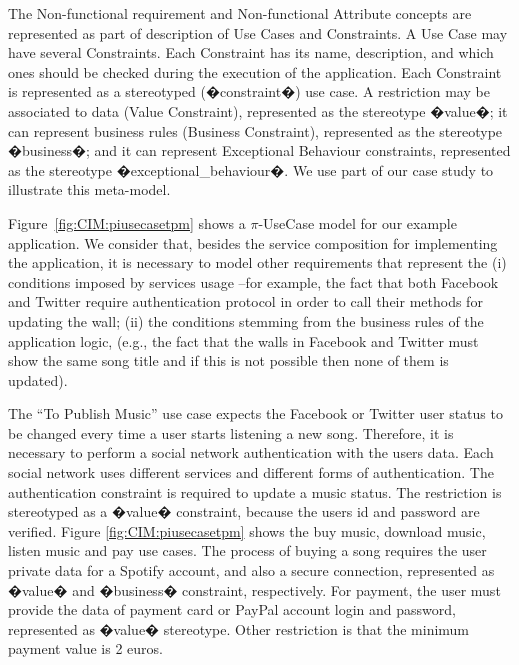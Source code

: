  The {\sc Non-functional requirement} and {\sc Non-functional Attribute} concepts are represented as part of description of {\sc Use Cases} and {\sc Constraints}. 
A {\sc Use Case} may have several {\sc Constraints}. Each {\sc Constraint} has its name, description, and which ones should be checked during the execution of the application. Each {\sc Constraint} is represented as a stereotyped ({\sf �constraint�}) use case. A restriction may be associated to data ({\sc Value Constraint}), represented as the stereotype �value�; it can represent business rules (Business Constraint), represented as the stereotype {\sf �business�}; and it can represent {\sc Exceptional Behaviour} constraints, represented as the stereotype {\sf �exceptional\_behaviour�}.
 We use part of our case study to illustrate this meta-model. 
 \begin{example}\label{ex:toPublicMusic2}
Figure~\ref{fig:CIM:piusecasetpm} shows a $\pi$-UseCase model for our example application.
We consider that, besides the service composition for implementing the application, it is necessary to model  other requirements that represent the (i) conditions imposed by services usage --for example, the fact that both Facebook and Twitter require authentication protocol in order to call their methods for updating the wall; (ii) the conditions stemming from the business rules of the application logic, (e.g., the fact that the walls in Facebook and Twitter must show the same song title and if this is not possible then none of them is updated). 
 
The ``To Publish Music'' use case expects  the Facebook or Twitter user status to be changed every time a user starts listening a new song.
  Therefore, it is necessary to perform a social network authentication with the users data. Each social network uses different services and different forms of authentication. The authentication constraint is required to update a music status. The restriction is stereotyped as a �value� constraint, because the users id and password are verified.  Figure \ref{fig:CIM:piusecasetpm} shows the buy music, download music, listen music and pay use cases. The process of buying a song requires the user private data for a Spotify account, and also a secure connection, represented as �value� and �business� constraint, respectively. For payment, the user must provide the data of payment card or PayPal account login and password, represented as �value� stereotype. Other restriction is that the minimum payment value is 2 euros.
\end{example}

